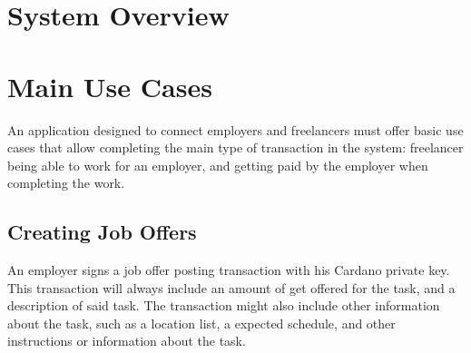 \documentclass{article}
\begin{document}
\section{System Overview}

\newpage

 
\section{Main Use Cases}
An application designed to connect employers and freelancers must offer basic use cases that allow completing the main type of transaction in the system: freelancer being able to work for an employer, and getting paid by the employer when completing the work.

\subsection{Creating Job Offers}
An employer signs a job offer posting transaction with his Cardano private key. This transaction will always include an amount of get offered for the task, and a description of said task. The transaction might also include other information about the task, such as a location list, a expected schedule, and other instructions or information about the task.
\end{document}
